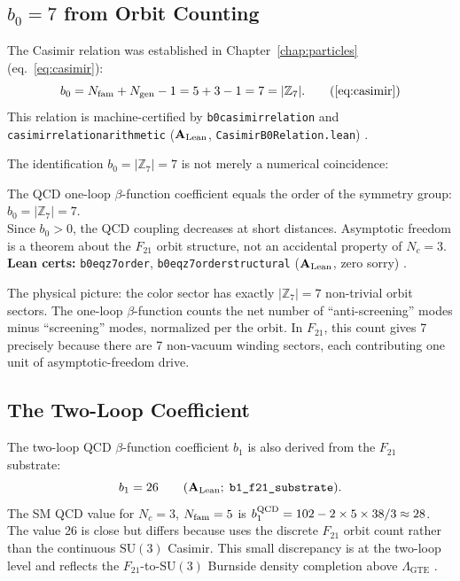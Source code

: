 \documentclass[11pt,openany]{book}
\theoremstyle{remark}
\newcommand{\GTE}{\text{GTE}}
\newcommand{\ZS}{\mathbb{Z}_7}
\newcommand{\lean}[1]{%
  \penalty-100
  \begingroup\def\_{\textunderscore\allowbreak}\texttt{#1}\endgroup}
\newcommand{\Ngen}{N_{\rm gen}}
\newcommand{\Nfam}{N_{\rm fam}}
\newcommand{\Nc}{N_c}
\newcommand{\CatAL}{\ensuremath{\textbf{A}_{\rm Lean}}}
\begin{document}
\subsection*{$b_0 = 7$ from Orbit Counting}

The Casimir relation was established in Chapter~\ref{chap:particles}
(eq.~\eqref{eq:casimir}):
\begin{equation}
  b_0 = \Nfam + \Ngen - 1 = 5 + 3 - 1 = 7 = |\ZS|.
  \tag{\ref{eq:casimir}}
\end{equation}
This relation is machine-certified by \lean{b0\_casimir\_relation} and
\lean{casimir\_relation\_arithmetic} (\CatAL, \lean{CasimirB0Relation.lean})
\cite{SpivackGTEQCDStructure}.

The identification $b_0 = |\ZS| = 7$ is not merely a numerical coincidence:

\begin{tcolorbox}[colback=orange!5,colframe=orange!60,title={Result: $b_0 = |\ZS| = 7$ (\CatAL)}]
The QCD one-loop $\beta$-function coefficient equals the order of the \GTE{} symmetry
group: $b_0 = |\ZS| = 7$.\\[4pt]
Since $b_0 > 0$, the QCD coupling decreases at short distances.  Asymptotic freedom
is a theorem about the $F_{21}$ orbit structure, not an accidental property of $\Nc = 3$.\\[4pt]
\textbf{Lean certs:} \lean{b0\_eq\_z7\_order}, \lean{b0\_eq\_z7\_order\_structural} (\CatAL, zero sorry) \cite{SpivackGTEQCDStructure}.
\end{tcolorbox}

The physical picture: the \GTE{} color sector has exactly $|\ZS| = 7$ non-trivial orbit
sectors.  The one-loop $\beta$-function counts the net number of ``anti-screening'' modes
minus ``screening'' modes, normalized per the orbit.  In $F_{21}$, this count gives 7
precisely because there are 7 non-vacuum winding sectors, each contributing one unit of
asymptotic-freedom drive.

\subsection*{The Two-Loop Coefficient}

The two-loop QCD $\beta$-function coefficient $b_1$ is also derived from the $F_{21}$
substrate:
\begin{equation}
  b_1 = 26 \qquad (\CatAL;\;\lean{b1\_f21\_substrate}).
  \label{eq:b1_qcd}
\end{equation}
The SM QCD value for $\Nc = 3$, $\Nfam = 5$ is $b_1^{\rm QCD} = 102 - 2\times 5 \times
38/3 \approx 28$.  The \GTE{} value 26 is close but differs because \GTE{} uses the
discrete $F_{21}$ orbit count rather than the continuous $\mathrm{SU}(3)$ Casimir.  This
small discrepancy is at the two-loop level and reflects the $F_{21}$-to-$\mathrm{SU}(3)$
Burnside density completion above $\Lambda_{\GTE}$ \cite{SpivackGTEQCDStructure}.
\end{document}
